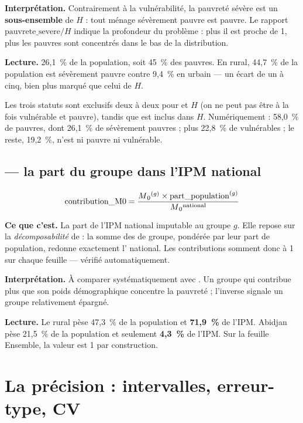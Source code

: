 \documentclass[11pt,a4paper]{article}
\begin{document}
\textbf{Interprétation.} Contrairement à la vulnérabilité, la pauvreté sévère est un
\textbf{sous-ensemble} de $H$ : tout ménage sévèrement pauvre est pauvre. Le rapport
$\text{pauvrete\_severe} / H$ indique la profondeur du problème : plus il est proche de 1, plus les
pauvres sont concentrés dans le bas de la distribution.

\textbf{Lecture.} 26,1~\% de la population, soit 45~\% des pauvres. En rural, 44,7~\% de la
population est sévèrement pauvre contre 9,4~\% en urbain --- un écart de un à cinq, bien plus
marqué que celui de $H$.

\begin{retenir}
Les trois statuts sont exclusifs deux à deux pour  et $H$ (on ne peut pas être à
la fois vulnérable et pauvre), tandis que  est inclus dans $H$.
Numériquement : 58,0~\% de pauvres, dont 26,1~\% de sévèrement pauvres ; plus 22,8~\% de
vulnérables ; le reste, 19,2~\%, n'est ni pauvre ni vulnérable.
\end{retenir}

\subsection*{ --- la part du groupe dans l'IPM national}

\[
\text{contribution\_M0} = \frac{M\textsubscript{0}^{(g)} \times \text{part\_population}^{(g)}}{M\textsubscript{0}^{\text{national}}}
\]

\textbf{Ce que c'est.} La part de l'IPM national imputable au groupe $g$. Elle repose sur la
\emph{décomposabilité} de \ipm{} : la somme des \ipm{} de groupe, pondérée par leur part de
population, redonne exactement l'\ipm{} national. Les contributions somment donc à 1 sur chaque
feuille --- vérifié automatiquement.

\textbf{Interprétation.} À comparer systématiquement avec . Un groupe qui
contribue plus que son poids démographique concentre la pauvreté ; l'inverse signale un groupe
relativement épargné.

\textbf{Lecture.} Le rural pèse 47,3~\% de la population et \textbf{71,9~\%} de l'IPM. Abidjan
pèse 21,5~\% de la population et seulement \textbf{4,3~\%} de l'IPM. Sur la feuille
\textsf{Ensemble}, la valeur est 1 par construction.

\section{La précision : intervalles, erreur-type, CV}
\end{document}
